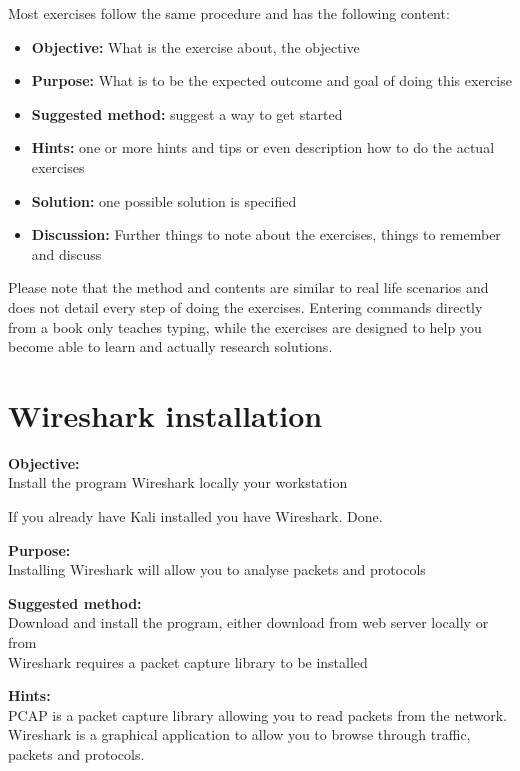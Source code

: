 \documentclass[a4paper,11pt,notitlepage]{report}
\begin{document}
Most exercises follow the same procedure and has the following content:
\begin{itemize}
\item {\bf Objective:} What is the exercise about, the objective
\item {\bf Purpose:} What is to be the expected outcome and goal of doing this exercise
\item {\bf Suggested method:} suggest a way to get started
\item {\bf Hints:} one or more hints and tips or even description how to
do the actual exercises
\item {\bf Solution:} one possible solution is specified
\item {\bf Discussion:} Further things to note about the exercises, things to remember and discuss
\end{itemize}

Please note that the method and contents are similar to real life scenarios and does not detail every step of doing the exercises. Entering commands directly from a book only teaches typing, while the exercises are designed to help you become able to learn and actually research solutions.



\chapter{Wireshark installation}
\label{ex:wireshark-install}



{\bf Objective:}\\
Install the program Wireshark locally your workstation

If you already have Kali installed you have Wireshark. Done.

{\bf Purpose:}\\
Installing Wireshark will allow you to analyse packets and protocols

{\bf Suggested method:}\\
Download and install the program, either download from web server locally or from \\
Wireshark requires a packet capture library to be installed

{\bf Hints:}\\
PCAP is a packet capture library allowing you to read packets from the network. Wireshark is a graphical application to allow you to browse through traffic, packets and protocols.
\end{document}
